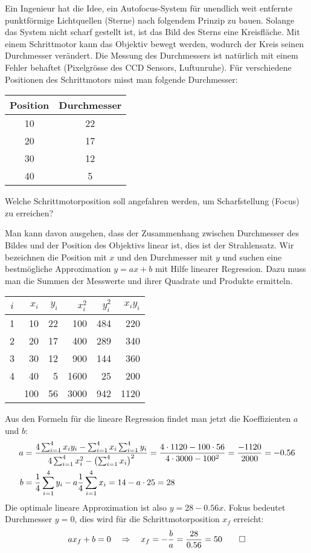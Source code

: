 Ein Ingenieur hat die Idee, ein Autofocus-System für unendlich weit
entfernte punktförmige
Lichtquellen (Sterne) nach folgendem Prinzip zu bauen.
Solange das System nicht scharf gestellt ist,
ist das Bild des Sterns eine Kreisfläche.
Mit einem Schrittmotor kann das Objektiv bewegt werden, wodurch der Kreis
seinen Durchmesser verändert. Die Messung des Durchmessers ist 
natürlich mit einem Fehler behaftet (Pixelgrösse des CCD Sensors,
Luftunruhe).
Für verschiedene Positionen des Schrittmotors misst man folgende
Durchmesser:
\begin{center}
\begin{tabular}{|c|c|}
\hline
Position&Durchmesser\\
\hline
10&22\\
20&17\\
30&12\\
40&5\\
\hline
\end{tabular}
\end{center}
Welche Schrittmotorposition soll angefahren werden, um Scharfstellung
(Focus) zu erreichen?

\begin{loesung}
Man kann davon ausgehen, dass der Zusammenhang zwischen Durchmesser
des Bildes und der Position des Objektivs linear ist, dies ist der
Strahlensatz. Wir bezeichnen die Position mit $x$ und den Durchmesser
mit $y$ und suchen eine bestmögliche Approximation $y=ax+b$ mit
Hilfe linearer Regression. Dazu muss man die Summen der Messwerte und
ihrer Quadrate und Produkte ermitteln.
\begin{center}
\begin{tabular}{|c|rr|rrr|}
\hline
$i$&$x_i$&$y_i$&$x_i^2$&$y_i^2$&$x_iy_i$\\
\hline
1& 10&22& 100&484& 220\\
2& 20&17& 400&289& 340\\
3& 30&12& 900&144& 360\\
4& 40& 5&1600& 25& 200\\
\hline
 &100&56&3000&942&1120\\
\hline
\end{tabular}
\end{center}
Aus den Formeln für die lineare Regression findet man jetzt die
Koeffizienten $a$ und $b$:
\begin{align*}
a&=\frac{
4\sum_{i=1}^4 x_iy_i-\sum_{i=1}^4x_i\sum_{i=1}^4y_i
}{
4\sum_{i=1}^4x_i^2-\bigl(\sum_{i=1}^4 x_i\bigr)^2
}
=
\frac{4\cdot 1120-100\cdot 56}{4\cdot 3000-100^2}=\frac{-1120}{2000}=-0.56
\\
b&=\frac14\sum_{i=1}^4y_i-a\frac14\sum_{i=1}^4x_i
=14 - a\cdot 25=28
\end{align*}
Die optimale lineare Approximation ist also $y=28-0.56x$.
Fokus bedeutet Durchmesser $y=0$, dies wird für die Schrittmotorposition
$x_f$ erreicht:
\[
ax_f+b=0\quad\Rightarrow\quad x_f=-\frac{b}{a}=\frac{28}{0.56}=50
\qedhere
\]
\end{loesung}
